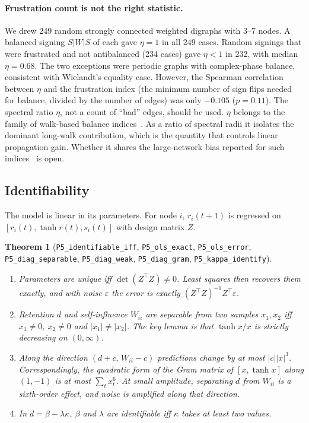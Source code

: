 \documentclass[11pt]{article}
\newtheorem{theorem}{Theorem}
\theoremstyle{definition}
\theoremstyle{remark}
\newcommand{\lean}[1]{\texttt{\small #1}}
\begin{document}
\paragraph{Frustration count is not the right statistic.}
We drew 249 random strongly connected
weighted digraphs with 3--7 nodes. A balanced signing $S|W|S$ of each gave $\eta=1$ in all 249 cases.
Random signings that were frustrated and not antibalanced (234 cases) gave $\eta<1$ in 232, with median
$\eta=0.68$. The two exceptions were periodic graphs with complex-phase balance, consistent with
Wielandt's equality case. However, the Spearman correlation between $\eta$ and the frustration index
(the minimum number of sign flips needed for balance, divided by the number of edges) was only
$-0.105$ ($p=0.11$). The spectral ratio $\eta$, not a count of ``bad'' edges, should be used.
$\eta$ belongs to the family of walk-based balance indices~\cite{estrada2014}. As a ratio of spectral radii
it isolates the dominant long-walk contribution, which is the quantity that controls linear
propagation gain. Whether it shares the large-network bias reported for such
indices~\cite{kirkley2019} is open.

\subsection{Identifiability}

The model is linear in its parameters. For node $i$, $r_i(t+1)$ is regressed on
$[r_i(t),\tanh r(t),s_i(t)]$ with design matrix $Z$.

\begin{theorem}[\lean{P5\_identifiable\_iff}, \lean{P5\_ols\_exact}, \lean{P5\_ols\_error},
\lean{P5\_diag\_separable}, \lean{P5\_diag\_weak}, \lean{P5\_diag\_gram}, \lean{P5\_kappa\_identify}]\label{thm:ident}
\leavevmode
\begin{enumerate}
\item Parameters are unique iff $\det(Z^\top Z)\ne0$. Least squares then recovers them exactly, and with
      noise $\varepsilon$ the error is exactly $(Z^\top Z)^{-1}Z^\top\varepsilon$.
\item Retention $d$ and self-influence $W_{ii}$ are separable from two samples $x_1,x_2$ iff
      $x_1\ne0$, $x_2\ne0$ and $|x_1|\ne|x_2|$. The key lemma is that $\tanh x/x$ is strictly decreasing on $(0,\infty)$.
\item Along the direction $(d+c,\,W_{ii}-c)$ predictions change by at most $|c||x|^3$. Correspondingly, the
      quadratic form of the Gram matrix of $[x,\tanh x]$ along $(1,-1)$ is at most $\sum_t x_t^6$. At small
      amplitude, separating $d$ from $W_{ii}$ is a sixth-order effect, and noise is amplified along
      that direction.
\item In $d=\beta-\lambda\kappa$, $\beta$ and $\lambda$ are identifiable iff $\kappa$ takes at least two values.
\end{enumerate}
\end{theorem}
\end{document}
